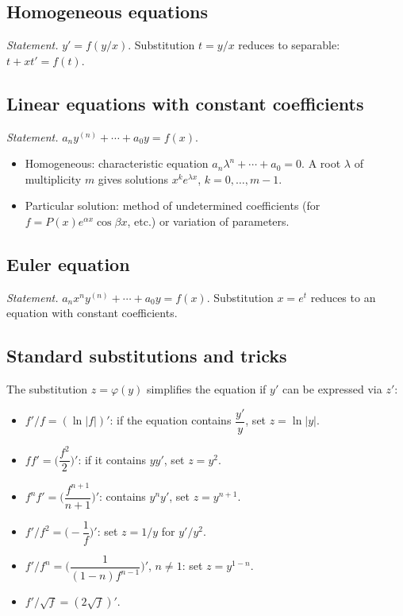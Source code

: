 \subsection{Homogeneous equations}
\label{subsec:ode-homogeneous}

\textit{Statement.} $y' = f(y/x)$. Substitution $t = y/x$ reduces to separable: $t + x t' = f(t)$.

\subsection{Linear equations with constant coefficients}
\label{subsec:ode-constant-coeff}

\textit{Statement.} $a_n y^{(n)} + \cdots + a_0 y = f(x)$.
\begin{itemize}
\item Homogeneous: characteristic equation $a_n\lambda^n+\cdots+a_0=0$. A root $\lambda$ of multiplicity $m$ gives solutions $x^k e^{\lambda x}$, $k=0,\dots,m-1$.
\item Particular solution: method of undetermined coefficients (for $f = P(x)e^{\alpha x}\cos\beta x$, etc.) or variation of parameters.
\end{itemize}

\subsection{Euler equation}
\label{subsec:ode-euler}

\textit{Statement.} $a_n x^n y^{(n)} + \cdots + a_0 y = f(x)$. Substitution $x = e^t$ reduces to an equation with constant coefficients.

\subsection{Standard substitutions and tricks}
\label{subsec:ode-substitutions}

The substitution $z = \varphi(y)$ simplifies the equation if $y'$ can be expressed via $z'$:

\begin{itemize}
\item $f'/f = (\ln|f|)'$: if the equation contains $\dfrac{y'}{y}$, set $z = \ln|y|$.
\item $ff' = \bigl(\dfrac{f^2}{2}\bigr)'$: if it contains $yy'$, set $z = y^2$.
\item $f^n f' = \bigl(\dfrac{f^{n+1}}{n+1}\bigr)'$: contains $y^n y'$, set $z = y^{n+1}$.
\item $f'/f^2 = \bigl(-\dfrac1f\bigr)'$: set $z = 1/y$ for $y'/y^2$.
\item $f'/f^n = \bigl(\dfrac{1}{(1-n)f^{n-1}}\bigr)'$, $n\neq1$: set $z = y^{1-n}$.
\item $f'/\sqrt{f} = (2\sqrt{f})'$.
\end{itemize}

